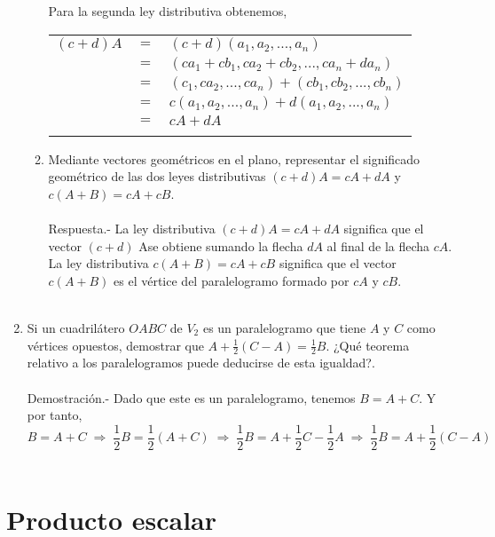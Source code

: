 \begin{enumerate}[\bfseries 1.]
\begin{enumerate}[\bfseries a)]
\begin{center}
\begin{tabular}{rcl}
	    \end{tabular}
	\end{center}
	Para la segunda ley distributiva obtenemos,
	\begin{center}
	    \begin{tabular}{rcl}
		$(c+d)A$&$=$&$(c+d)(a_1,a_2,...,a_n)$\\
		&$=$&$(ca_1+cb_1,ca_2+cb_2,...,ca_n+da_n)$\\
		&$=$&$(c_1,ca_2,...,ca_n)+(cb_1,cb_2,...,cb_n)$\\
		&$=$&$c(a_1,a_2,...,a_n)+d(a_1,a_2,...,a_n)$\\
		&$=$&$cA+dA$\\\\
	    \end{tabular}
	\end{center}

    \item Mediante vectores geométricos en el plano, representar el significado geométrico de las dos leyes distributivas $(c+d)A=cA+dA$ y $c(A+B) = cA+cB$.\\\\
	Respuesta.-\; La ley distributiva $(c + d) A = cA + dA$ significa que el vector $(c + d)$ Ase obtiene sumando la flecha $dA$ al final de la flecha $cA$.\\
La ley distributiva $c (A + B) = cA + cB$ significa que el vector $c (A + B)$ es el vértice del paralelogramo formado por $cA$ y $cB$.\\\\

\end{enumerate}

\item Si un cuadrilátero $OABC$ de $V_2$ es un paralelogramo que tiene $A$ y $C$ como vértices opuestos, demostrar que $A+\frac{1}{2}(C-A) =\frac{1}{2}B$. ¿Qué teorema relativo a los paralelogramos puede deducirse de esta igualdad?.\\\\
    Demostración.-\; Dado que este es un paralelogramo, tenemos $B=A+C$. Y por tanto,
    $$B=A+C\; \Longrightarrow\; \dfrac{1}{2}B=\dfrac{1}{2}(A+C)\; \Longrightarrow\; \dfrac{1}{2}B = A + \dfrac{1}{2}C - \dfrac{1}{2} A \;\Longrightarrow \; \dfrac{1}{2}B = A + \dfrac{1}{2}(C-A)$$\\

\end{enumerate}


\section{Producto escalar}

